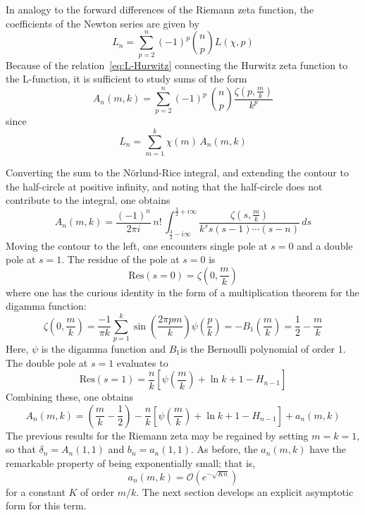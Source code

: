 \documentclass{amsart}
\begin{document}
In analogy to the forward differences of the Riemann
zeta function, the coefficients of the Newton series 
are given by
\begin{equation}
L_{n}=\sum_{p=2}^{n}(-1)^{p}
\binom{n}{p}
L(\chi,p)\label{eq:L-coeff}\end{equation}
 Because of the relation~\eqref{eq:L-Hurwitz} connecting the Hurwitz
zeta function to the L-function, it is sufficient to study sums of
the form
\begin{equation}
A_{n}(m,k)=\sum_{p=2}^{n}(-1)^{p}\
\binom{n}{p}
\frac{\zeta\left(p,\frac{m}{k}\right)}{k^{p}}
\end{equation}
 since 
\begin{equation}
L_{n}=\sum_{m=1}^{k}\chi(m)\, A_{n}(m,k)
\end{equation}

 Converting the sum to the N\"orlund-Rice integral, and extending the
contour to the half-circle at positive infinity, and noting that the
half-circle does not contribute to the integral, one obtains 
\begin{equation}
A_{n}(m,k)=\frac{(-1)^{n}}{2\pi i}\, n!\,
\int_{\frac{3}{2}-i\infty}^{\frac{3}{2}+i\infty}
\frac{\zeta\left(s,\frac{m}{k}\right)}{k^{s}s(s-1)\cdots(s-n)}\, ds
\end{equation}
 Moving the contour to the left, one encounters single pole at $s=0$
and a double pole at $s=1$. The residue of the pole at $s=0$ is
\begin{equation}
\mbox{Res}(s=0)=\zeta\left(0,\frac{m}{k}\right)
\end{equation}
 where one has the curious identity in the form of a multiplication
theorem for the digamma function:
\begin{equation}
\zeta\left(0,\frac{m}{k}\right)
=\frac{-1}{\pi k}\sum_{p=1}^{k}\sin\left(\frac{2\pi pm}{k}\right)
\psi\left(\frac{p}{k}\right)
=-B_{1}\left(\frac{m}{k}\right)
=\frac{1}{2}-\frac{m}{k}
\end{equation}
 Here, $\psi$ is the digamma function and $B_{1}$is the Bernoulli
polynomial of order 1. The double pole at $s=1$ evaluates to
\begin{equation}
\mbox{Res}(s=1)=\frac{n}{k}
\left[\psi\left(\frac{m}{k}\right)+\ln k+1-H_{n-1}\right]
\end{equation}
 Combining these, one obtains 
\begin{equation}
A_{n}(m,k)=\left(\frac{m}{k}-\frac{1}{2}\right)
-\frac{n}{k}\left[\psi\left(\frac{m}{k}\right)+\ln k+1-H_{n-1}\right]
+a_{n}(m,k)
\end{equation}
The previous results for the Riemann zeta may be regained by setting 
$m=k=1$, so that $\delta_n=A_n(1,1)$ and $b_n=a_n(1,1)$.  As before,
the $a_n(m,k)$ have the remarkable property of being exponentially
small; that is, 
\begin{equation}
a_{n}(m,k)=\mathcal{O}\left(e^{-\sqrt{Kn}}\right)
\end{equation}
 for a constant $K$ of order $m/k$. The next section develops an
explicit asymptotic form for this term.
\end{document}
